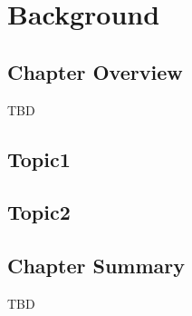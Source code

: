 \chapter{Background}
\label{ch:background}

\section{Chapter Overview}

TBD

\section{Topic1}

\section{Topic2}

\section{Chapter Summary}

TBD